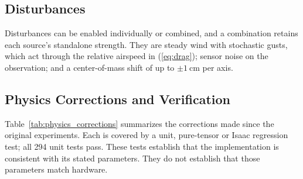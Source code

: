 \documentclass[conference]{IEEEtran}
\begin{document}
\subsection{Disturbances}

Disturbances can be enabled individually or combined, and a combination retains each source's standalone strength. They are steady wind with stochastic gusts, which act through the relative airspeed in (\ref{eq:drag}); sensor noise on the observation; and a center-of-mass shift of up to $\pm\SI{1}{\centi\metre}$ per axis.

\subsection{Physics Corrections and Verification}
\label{sec:physics_corrections}

Table~\ref{tab:physics_corrections} summarizes the corrections made since the original experiments. Each is covered by a unit, pure-tensor or Isaac regression test; all 294 unit tests pass. These tests establish that the implementation is consistent with its stated parameters. They do not establish that those parameters match hardware.
\end{document}
